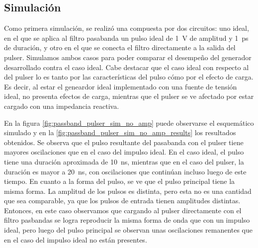 \subsection{Simulación}

Como primera simulación, se realizó una compuesta por dos circuitos: uno ideal,
en el que se aplica al filtro pasabanda un pulso ideal de \qty{1}{\volt} de
amplitud y \qty{1}{\pico\second} de duración, y otro en el que se conecta el
filtro directamente a la salida del pulser. Simulamos ambos casos para poder
comparar el desempeño del generador desarrollado contra el caso ideal. Cabe
destacar que el caso ideal con respecto al del pulser lo es tanto por las
características del pulso cómo por el efecto de carga. Es decir, al estar el
geneardor ideal implementado con una fuente de tensión ideal, no presenta
efectos de carga, mientras que el pulser se ve afectado por estar cargado con
una impedancia reactiva.

En la figura \ref{fig:passband_pulser_sim_no_amp} puede observarse el
esquemático simulado y en la \ref{fig:passband_pulser_sim_no_amp_results} los
resultados obtenidos. Se observa que el pulso resultante del pasabanda con el
pulser tiene mayores oscilaciones que en el caso del impulso ideal. En el caso
ideal, el pulso tiene una duración aproximada de \qty{10}{\nano\second},
mientras que en el caso del pulser, la duración es mayor a
\qty{20}{\nano\second}, con oscilaciones que continúan incluso luego de este
tiempo. En cuanto a la forma del pulso, se ve que el pulso principal tiene la
misma forma. La amplitud de los pulsos es distinta, pero esta no es una cantidad
que sea comparable, ya que los pulsos de entrada tienen amplitudes distintas.
Entonces, en este caso observamos que cargando al pulser directamente con el
filtro pasbandas se logra reproducir la misma forma de onda que con un impulso
ideal, pero luego del pulso principal se observan unas oscilaciones remanentes
que en el caso del impulso ideal no están presentes.


